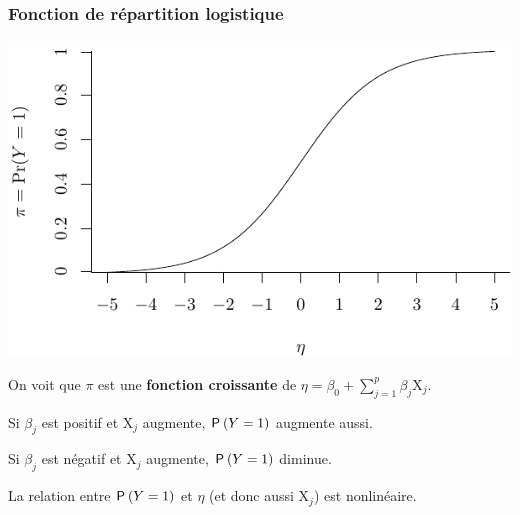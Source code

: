 \documentclass{beamer}
\begin{document}
\begin{frame}[fragile]
\frametitle{Fonction de répartition logistique}



\begin{center}
\includegraphics[width = 0.7\linewidth]{img/c4/08-glm-logisticcdf}
\end{center}
\bi
\item On voit que $\pi$ est une \textbf{fonction croissante} de $\eta=\beta_0 + \sum_{j=1}^p \beta_j \mathrm{X}_{j}$.
{\small \bi 
\item Si $\beta_j$ est positif et $\mathrm{X}_{j}$ augmente, $\P{Y=1}$ augmente aussi.  
\item Si $\beta_j$ est négatif et  $\mathrm{X}_{j}$ augmente, $\P{Y=1}$ diminue. 
\ei
}
\item La relation entre $\P{Y=1}$ et $\eta$ (et donc aussi $\mathrm{X}_{j}$) est \alert{nonlinéaire}.
\ei
\end{frame}
% 
% 
\end{document}
